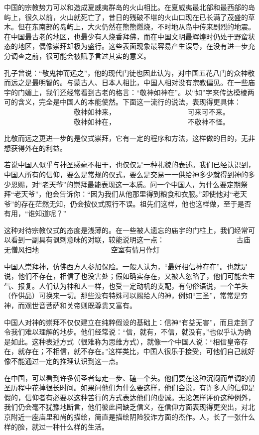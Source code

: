 \documentclass[12pt,oneside]{book}
\begin{document}
\begin{common-format}
中国的宗教势力可以和造成夏威夷群岛的火山相比。在夏威夷最北部和最西部的岛屿上，很久以前，火山就死亡了，昔日的残破不堪的火山口现在已长满了茂盛的草木。但在东南部的岛屿上，大火仍然在熊熊燃烧，不时地从岛中传来剧烈的地震。在中国最古老的地区，也最少有人烧香拜佛，而在中国文明最辉煌时仍处于野蛮状态的地区，偶像崇拜却极为盛行。这些表面现象最容易产生误导，在没有进一步充分调查之前，很可能会被赋予言过其实的意义。 

孔子曾说：“敬鬼神而远之”，他的现代门徒也因此认为，对中国五花八门的众神敬而远之是最明智的。与蒙古人、日本人相比，中国人相对没有宗教偏见。在一些庙宇的门媚上，我们还经常看到古老的格言：“敬神如神在”。以“如”字来传达模棱两可的含义，完全是中国人的本能使然。下面这一流行的说法，表现得更具体： 
　　　　　　　　　　敬神如神来， 
　　　　　　　　　　可来可不来。 
　　　　　　　　　　敬神如神在， 
　　　　　　　　　　不敬神不怪。 

比敬而远之更进一步的是仪式崇拜，它有一定的程序和方法，这样做的目的，无非想获得外在的利益。 

若说中国人似乎与神圣感毫不相干，也仅仅是一种礼貌的表述。我们已经认识到，中国人所有的信仰，要么是常规的仪式，要么是交易一一供给神多少就得到神的多少恩赐，对“老天爷”的崇拜最能表现这一本质。问一个中国人，为什么要定期祭拜“老天爷”，他会告诉你：“因为我们从他那里得到粮食和衣服。”即使他对“老天爷”的存在茫然无知，仍会按仪式照行不误。祖先们这样，他也这样做，至于是否有用，“谁知道呢？” 

这种对待宗教仪式的态度是浅薄的。在一些被人遗忘的庙宇的门柱上，我们经常可以看到一副具有讽刺意味的对联，较能说明这一点： 
　　　　　　　　　　古庙无僧风扫地 
　　　　　　　　　　空室有情月作灯 

中国人崇拜神，仿佛西方人参加保险。一般人认为，“最好相信神存在”。也就是说，他们不存在，相信了也没害处；假如确实存在，又被人忽略了，他们可能会生气、报复。人们认为神和人一样，也受一定动机的支配，有句俗语说，一个羊头（作供品）可换来一切。那些没有特殊可以赐给人的神，例如“三圣”，常常是穷神，而观世音菩萨和关帝则既尊贵又富有。 

中国人对神的崇拜不仅仅建立在纯粹假设的基础上：信神“有益无害”，而且走到了令我们难以理解的地步。他们经常说：“信，就有，不信，就没有。”也似乎认为确是如此。这种表述方式（很难称为思维方式），就像一个中国人说：“相信皇帝存在，就存在；不相信，就不存在。”这样类比，中国人很乐于接受，可他们自己就好像不能通过一定的推理认识到这一点。 

在中国，可以看到许多朝圣者每走一步、磕一个头。他们要在这种沉闷而单调的朝圣历程中花掉很长时间。如果问他们为什么要这样，他们会说，有许多人的信仰是假的，信仰者有必要以这种苦行的方式表达他们的虔诚。无论怎样评价这种例外，我们仍会毫不犹豫地断言，他们彼此间缺乏信义，在信仰方面表现得更突出，对北京附近一座庙里和尚的描绘，简直是描绘阴险狡诈方面的杰作。人，长了一张什么样的脸，就过一种什么样的生活。 


\end{common-format}
\end{document}

